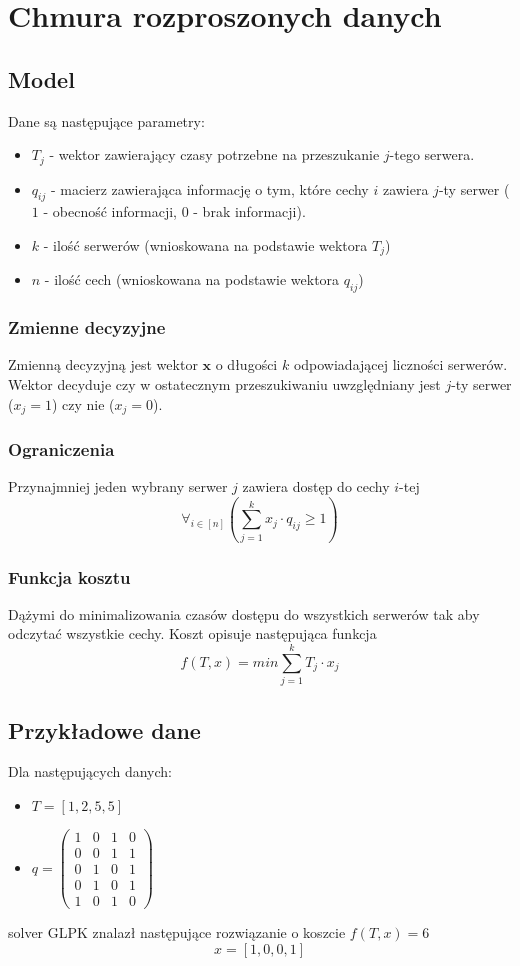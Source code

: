 \section{Chmura rozproszonych danych}

\subsection{Model}
Dane są następujące parametry:
\begin{itemize}
    \item $T_j$ - wektor zawierający czasy potrzebne na przeszukanie $j$-tego serwera.
    \item $q_{ij}$ - macierz zawierająca informację o tym, które cechy $i$ zawiera $j$-ty serwer ($1$ - obecność informacji, $0$ - brak informacji).
    \item $k$ - ilość serwerów (wnioskowana na podstawie wektora $T_j$)
    \item $n$ - ilość cech (wnioskowana na podstawie wektora $q_{ij}$)
\end{itemize}

\subsubsection{Zmienne decyzyjne}
Zmienną decyzyjną jest wektor $\mathbf{x}$ o długości $k$ odpowiadającej liczności serwerów. Wektor decyduje czy w ostatecznym przeszukiwaniu uwzględniany jest $j$-ty serwer ($x_j = 1$) czy nie ($x_j = 0$).

\subsubsection{Ograniczenia}
Przynajmniej jeden wybrany serwer $j$ zawiera dostęp do cechy $i$-tej
$$ \forall_{i\in[n]} (\sum_{j=1}^{k} x_j \cdot q_{ij} \geq 1) $$

\subsubsection{Funkcja kosztu}
Dążymi do minimalizowania czasów dostępu do wszystkich serwerów tak aby odczytać wszystkie cechy. Koszt opisuje następująca funkcja
$$ f(T, x) = \textit{min}\sum_{j=1}^{k} T_j \cdot x_j $$

\subsection{Przykładowe dane}
Dla następujących danych:
\begin{itemize}
    \item $T = [1, 2, 5, 5]$
    \item $q = \left( \begin{matrix} 1 & 0 & 1 & 0 \\ 0 & 0 & 1 & 1 \\ 0 & 1 & 0 & 1 \\ 0 & 1 & 0 & 1 \\ 1 & 0 & 1 & 0 \end{matrix} \right) $
\end{itemize}

solver GLPK znalazł następujące rozwiązanie o koszcie $f(T, x) = 6$
$$ x = [1,0,0,1] $$
